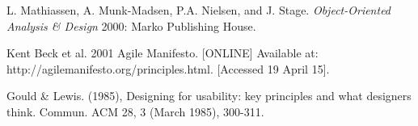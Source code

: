 \documentclass[11pt,a4paper]{report}
\begin{document}
\begin{thebibliography}{1}

 L. Mathiassen, A. Munk-Madsen, P.A. Nielsen, and J. Stage. {\em Object-Oriented Analysis \& Design} 2000: Marko Publishing House.

 Kent Beck et al. 2001 Agile Manifesto. [ONLINE] Available at: http://agilemanifesto.org/principles.html. [Accessed 19 April 15].

 Gould \& Lewis. (1985), Designing for usability: key principles and what designers think. Commun. ACM 28, 3 (March 1985), 300-311.




\end{thebibliography}
\end{document}
